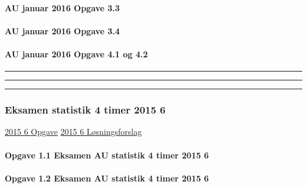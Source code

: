 \documentclass[]{book}
\let\oldparagraph\paragraph
\renewcommand{\paragraph}[1]{\oldparagraph{#1}\mbox{}}
\begin{document}
\hypertarget{au-januar-2016-opgave-3.3}{%
\paragraph{AU januar 2016 Opgave 3.3}\label{au-januar-2016-opgave-3.3}}

\hypertarget{au-januar-2016-opgave-3.4}{%
\paragraph{AU januar 2016 Opgave 3.4}\label{au-januar-2016-opgave-3.4}}

\hypertarget{au-januar-2016-opgave-4.1-og-4.2}{%
\paragraph{AU januar 2016 Opgave 4.1 og 4.2}\label{au-januar-2016-opgave-4.1-og-4.2}}

\begin{center}\rule{0.5\linewidth}{\linethickness}\end{center}

\begin{center}\rule{0.5\linewidth}{\linethickness}\end{center}

\begin{center}\rule{0.5\linewidth}{\linethickness}\end{center}

\hypertarget{eksamen-statistik-4-timer-2015-6}{%
\subsubsection{Eksamen statistik 4 timer 2015 6}\label{eksamen-statistik-4-timer-2015-6}}

\href{https://www.dropbox.com/s/lpyp894as98ho11/Smartlearning\%20AU\%202015\%206.pdf?dl=1}{2015 6 Opgave}
\href{https://www.dropbox.com/s/kf4avnc43qpz20d/2015\%206\%20AU\%20SMART\%20Vejledende.docx?dl=1}{2015 6 Løsningsforslag}

\hypertarget{opgave-1.1-eksamen-au-statistik-4-timer-2015-6}{%
\paragraph{Opgave 1.1 Eksamen AU statistik 4 timer 2015 6}\label{opgave-1.1-eksamen-au-statistik-4-timer-2015-6}}

\hypertarget{opgave-1.2-eksamen-au-statistik-4-timer-2015-6}{%
\paragraph{Opgave 1.2 Eksamen AU statistik 4 timer 2015 6}\label{opgave-1.2-eksamen-au-statistik-4-timer-2015-6}}
\end{document}
